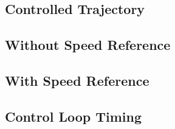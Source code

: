 \documentclass[a4paper, 12pt]{report}
\begin{document}
\subsection{Controlled Trajectory}
\subsection{Without Speed Reference}
\subsection{With Speed Reference}
\subsection{Control Loop Timing}
\end{document}
